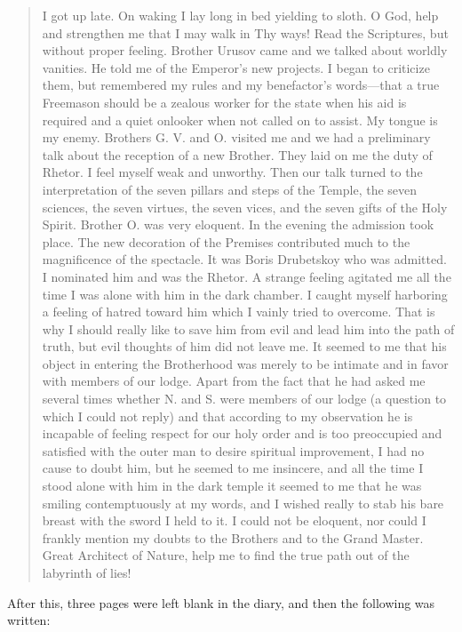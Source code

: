 \begin{quote}
I got up late. On waking I lay long in bed yielding to sloth. O
God, help and strengthen me that I may walk in Thy ways! Read the
Scriptures, but without proper feeling. Brother Urusov came and
we talked about worldly vanities. He told me of the Emperor's new
projects. I began to criticize them, but remembered my rules and
my benefactor's words---that a true Freemason should be a zealous
worker for the state when his aid is required and a quiet
onlooker when not called on to assist. My tongue is my
enemy. Brothers G. V. and O. visited me and we had a preliminary
talk about the reception of a new Brother. They laid on me the
duty of Rhetor. I feel myself weak and unworthy. Then our talk
turned to the interpretation of the seven pillars and steps of
the Temple, the seven sciences, the seven virtues, the seven
vices, and the seven gifts of the Holy Spirit. Brother O. was
very eloquent. In the evening the admission took place. The new
decoration of the Premises contributed much to the magnificence
of the spectacle. It was Boris Drubetskoy who was admitted.  I
nominated him and was the Rhetor. A strange feeling agitated me
all the time I was alone with him in the dark chamber. I caught
myself harboring a feeling of hatred toward him which I vainly
tried to overcome. That is why I should really like to save him
from evil and lead him into the path of truth, but evil thoughts
of him did not leave me. It seemed to me that his object in
entering the Brotherhood was merely to be intimate and in favor
with members of our lodge. Apart from the fact that he had asked
me several times whether N. and S. were members of our lodge (a
question to which I could not reply) and that according to my
observation he is incapable of feeling respect for our holy order
and is too preoccupied and satisfied with the outer man to desire
spiritual improvement, I had no cause to doubt him, but he seemed
to me insincere, and all the time I stood alone with him in the
dark temple it seemed to me that he was smiling contemptuously at
my words, and I wished really to stab his bare breast with the
sword I held to it.  I could not be eloquent, nor could I frankly
mention my doubts to the Brothers and to the Grand Master. Great
Architect of Nature, help me to find the true path out of the
labyrinth of lies!
\end{quote}

After this, three pages were left blank in the diary, and then
the following was written:

